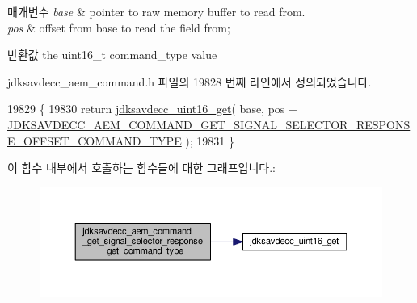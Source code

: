 \begin{DoxyParams}{매개변수}
{\em base} & pointer to raw memory buffer to read from. \\
\hline
{\em pos} & offset from base to read the field from; \\
\hline
\end{DoxyParams}
\begin{DoxyReturn}{반환값}
the uint16\+\_\+t command\+\_\+type value 
\end{DoxyReturn}


jdksavdecc\+\_\+aem\+\_\+command.\+h 파일의 19828 번째 라인에서 정의되었습니다.


\begin{DoxyCode}
19829 \{
19830     \textcolor{keywordflow}{return} \hyperlink{group__endian_ga3fbbbc20be954aa61e039872965b0dc9}{jdksavdecc\_uint16\_get}( base, pos + 
      \hyperlink{group__command__get__signal__selector__response_gaf2385da4366372ac79597ab3e88e8494}{JDKSAVDECC\_AEM\_COMMAND\_GET\_SIGNAL\_SELECTOR\_RESPONSE\_OFFSET\_COMMAND\_TYPE}
       );
19831 \}
\end{DoxyCode}


이 함수 내부에서 호출하는 함수들에 대한 그래프입니다.\+:
\nopagebreak
\begin{figure}[H]
\begin{center}
\leavevmode
\includegraphics[width=350pt]{group__command__get__signal__selector__response_gaa8b413b289f9814bb8a6013b7691a7d0_cgraph}
\end{center}
\end{figure}


